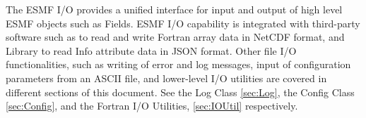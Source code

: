 

The ESMF I/O provides a unified interface for input and output of
high level ESMF objects such as Fields.  ESMF I/O capability is integrated
with third-party software such as 
to read and write Fortran array data in NetCDF format, and 
Library to read Info attribute data in JSON format.  Other file I/O
functionalities, such as writing of error and log messages, input of
configuration parameters from an ASCII file, and lower-level I/O utilities are
covered in different sections of this document.  See the Log Class 
\ref{sec:Log}, the Config Class \ref{sec:Config}, and the Fortran 
I/O Utilities, \ref{sec:IOUtil} respectively.

%
%


